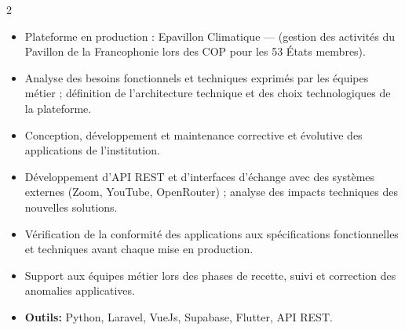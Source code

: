 \documentclass[10pt,a4paper,ragged2e,withhyper]{altacv}
\begin{document}
\begin{paracol}{2}
            \begin{itemize}
                \item Plateforme en production : Epavillon Climatique —  (gestion des activités du Pavillon de la Francophonie lors des COP pour les 53 États membres).
                \item Analyse des besoins fonctionnels et techniques exprimés par les équipes métier ; définition de l'architecture technique et des choix technologiques de la plateforme.
                \item Conception, développement et maintenance corrective et évolutive des applications de l'institution.
                \item Développement d'API REST et d'interfaces d'échange avec des systèmes externes (Zoom, YouTube, OpenRouter) ; analyse des impacts techniques des nouvelles solutions.
                \item Vérification de la conformité des applications aux spécifications fonctionnelles et techniques avant chaque mise en production.
                \item Support aux équipes métier lors des phases de recette, suivi et correction des anomalies applicatives.
                \item \textcolor{SecondaryColor}{\textbf{Outils: }} Python, Laravel, VueJs, Supabase, Flutter, API REST.
            \end{itemize}
            \divider


\end{paracol}
\end{document}
